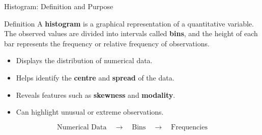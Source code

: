 \documentclass{beamer}
\begin{document}

\begin{frame}{Histogram: Definition and Purpose}

\begin{block}{Definition}
A \textbf{histogram} is a graphical representation of a
quantitative variable. The observed values are divided into
intervals called \textbf{bins}, and the height of each bar
represents the frequency or relative frequency of observations.
\end{block}

\vspace{0.25cm}

\begin{itemize}
    \item Displays the distribution of numerical data.
    \item Helps identify the \textbf{centre} and \textbf{spread} of the data.
    \item Reveals features such as \textbf{skewness} and \textbf{modality}.
    \item Can highlight unusual or extreme observations.
\end{itemize}

\vspace{0.15cm}

\begin{center}
\setlength{\fboxsep}{8pt}

\[
\boxed{\text{Numerical Data}}
\quad\longrightarrow\quad
\boxed{\text{Bins}}
\quad\longrightarrow\quad
\boxed{\text{Frequencies}}
\]
\end{center}

\end{frame}





\end{document}
